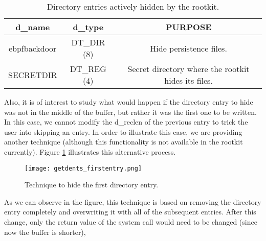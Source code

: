 \begin{table}[htbp]
\begin{tabular}{|c|c|c|}
\hline
\textbf{d\_name} & \textbf{d\_type} & \textbf{PURPOSE} \\
\hline
\hline
ebpfbackdoor & DT\_DIR (8) & Hide persistence files.\\
\hline
SECRETDIR & DT\_REG (4) & Secret directory where the rootkit hides its files.\\
\hline
\end{tabular}
\caption{Directory entries actively hidden by the rootkit.}
\label{table:dtype_dirent}
\end{table}

Also, it is of interest to study what would happen if the directory entry to hide was not in the middle of the buffer, but rather it was the first one to be written. In this case, we cannot modify the d\_reclen of the previous entry to trick the user into skipping an entry. In order to illustrate this case, we are providing another technique (although this functionality is not available in the rootkit currently). Figure \ref{fig:getdents_firstentry} illustrates this alternative process.

\begin{figure}[htbp]
	\centering
	\texttt{[image: getdents\_firstentry.png]}
	\caption{Technique to hide the first directory entry.}
	\label{fig:getdents_firstentry}
\end{figure}

As we can observe in the figure, this technique is based on removing the directory entry completely and overwriting it with all of the subsequent entries. After this change, only the return value of the system call would need to be changed (since now the buffer is shorter),

